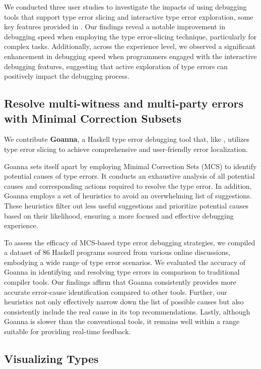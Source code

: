 We conducted three user studies to investigate the impacts of using debugging tools that support type error slicing and interactive type error exploration, some key features provided in \chameleon{}. Our findings reveal a notable improvement in debugging speed when employing the type error-slicing technique, particularly for complex tasks. Additionally, across the experience level, we observed a significant enhancement in debugging speed when programmers engaged with the interactive debugging features, suggesting that active exploration of type errors can positively impact the debugging process.

\subsection*{Resolve multi-witness and multi-party errors with Minimal Correction Subsets}

We contribute \textbf{Goanna}, a Haskell type error debugging tool that, like \chameleon{}, utilizes type error slicing to achieve comprehensive and user-friendly error localization.

Goanna sets itself apart by employing Minimal Correction Sets (MCS) to identify potential causes of type errors. It conducts an exhaustive analysis of all potential causes and corresponding actions required to resolve the type error. In addition, Goanna employs a set of heuristics to avoid an overwhelming list of suggestions. These heuristics filter out less useful suggestions and prioritize potential causes based on their likelihood, ensuring a more focused and effective debugging experience.


To assess the efficacy of MCS-based type error debugging strategies, we compiled a dataset of 86 Haskell programs sourced from various online discussions, embodying a wide range of type error scenarios. We evaluated the accuracy of Goanna in identifying and resolving type errors in comparison to traditional compiler tools. Our findings affirm that Goanna consistently provides more accurate error-cause identification compared to other tools. Further, our heuristics not only effectively narrow down the list of possible causes but also consistently include the real cause in its top recommendations. Lastly, although Goanna is slower than the conventional tools, it remains well within a range suitable for providing real-time feedback. 

\subsection*{Visualizing Types}

